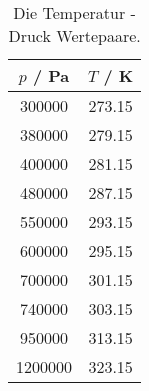\begin{table}[!htp]
\centering
\caption{Die Temperatur - Druck Wertepaare.}
\label{tab:temppa}
\begin{tabular}{c c}
\toprule $p$ / Pa & $T$ / K \\
\midrule
300000 & 273.15 \\
380000 & 279.15 \\
400000 & 281.15 \\
480000 & 287.15 \\
550000 & 293.15 \\
600000 & 295.15 \\
700000 & 301.15 \\
740000 & 303.15 \\
950000 & 313.15 \\
1200000& 323.15 \\
\bottomrule
\end{tabular}
\end{table}